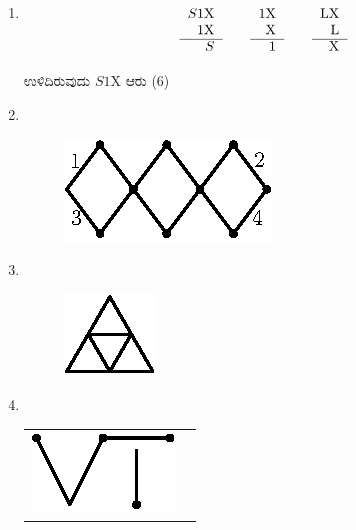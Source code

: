 \begin{enumerate}
\item 
\begin{equation*}
\begin{tabular}[t]{r}
$S1$X \\
$1$X\\\cline{1-1} 
$S$
\end{tabular}
\quad\quad
\begin{tabular}[t]{r}
1X\\ 
X\\\cline{1-1} 
1
\end{tabular}
\quad\quad
\begin{tabular}[t]{r}
LX\\
L\\\cline{1-1}
X
\end{tabular}
\end{equation*}

ಉಳಿದಿರುವುದು $S1$X ಆರು (6)

\item 
~

\begin{figure}[H]
\centering
\includegraphics[scale=1.1]{images/chap4/ans13.eps}
\end{figure}



\item 
~
\phantom{a}
\vskip -0.8cm
\begin{figure}[H]
\centering
\includegraphics[scale=1.4]{images/chap4/ans14.eps}
\end{figure}


\item
~

\begin{tabular}[t]{cc}
\includegraphics[scale =0.8]{images/chap4/ans15.eps} & \raisebox{.3cm}{$= 1$}
\end{tabular}



\end{enumerate}
